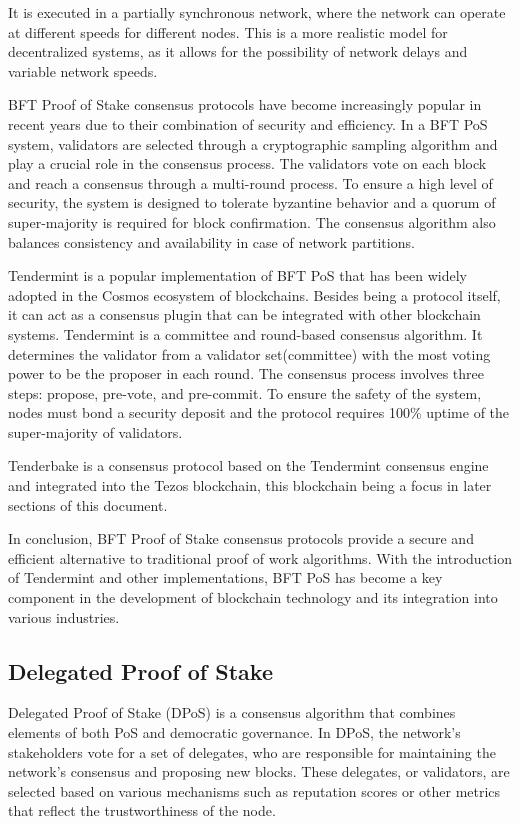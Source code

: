 It is executed in a partially synchronous network, where the network can operate at different speeds for different nodes. This is a more realistic model for decentralized systems, as it allows for the possibility of network delays and variable network speeds. 

BFT Proof of Stake consensus protocols have become increasingly popular in recent years due to their combination of security and efficiency. In a BFT PoS system, validators are selected through a cryptographic sampling algorithm and play a crucial role in the consensus process. The validators vote on each block and reach a consensus through a multi-round process. To ensure a high level of security, the system is designed to tolerate byzantine behavior and a quorum of super-majority is required for block confirmation. The consensus algorithm also balances consistency and availability in case of network partitions.

Tendermint is a popular implementation of BFT PoS that has been widely adopted in the Cosmos ecosystem of blockchains. Besides being a protocol itself, it can act as a consensus plugin that can be integrated with other blockchain systems.
Tendermint is a committee and round-based consensus algorithm. It determines the validator from a validator set(committee) with the most voting power to be the proposer in each round. The consensus process involves three steps: propose, pre-vote, and pre-commit. To ensure the safety of the system, nodes must bond a security deposit and the protocol requires 100\% uptime of the super-majority of validators.

Tenderbake is a consensus protocol based on the Tendermint consensus engine and integrated into the Tezos blockchain, this blockchain being a focus in later sections of this document.

In conclusion, BFT Proof of Stake consensus protocols provide a secure and efficient alternative to traditional proof of work algorithms. With the introduction of Tendermint and other implementations, BFT PoS has become a key component in the development of blockchain technology and its integration into various industries.

\subsection*{\textbf{Delegated Proof of Stake}}

Delegated Proof of Stake (DPoS) is a consensus algorithm that combines elements of both PoS and democratic governance. In DPoS, the network's stakeholders vote for a set of delegates, who are responsible for maintaining the network's consensus and proposing new blocks. These delegates, or validators, are selected based on various mechanisms such as reputation scores or other metrics that reflect the trustworthiness of the node.

